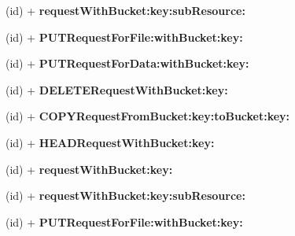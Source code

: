\begin{DoxyCompactItemize}
\item 
\hypertarget{interface_a_s_i_s3_object_request_aac357e6e8d9eab201a5d97c6e2ad1574}{
(id) + {\bfseries request\-With\-Bucket\-:key\-:sub\-Resource\-:}}
\label{interface_a_s_i_s3_object_request_aac357e6e8d9eab201a5d97c6e2ad1574}

\item 
\hypertarget{interface_a_s_i_s3_object_request_a07ff4bdb86902d59cb602be9bdc7ac14}{
(id) + {\bfseries \-P\-U\-T\-Request\-For\-File\-:with\-Bucket\-:key\-:}}
\label{interface_a_s_i_s3_object_request_a07ff4bdb86902d59cb602be9bdc7ac14}

\item 
\hypertarget{interface_a_s_i_s3_object_request_a06b5bf032c9b54a0fd0b17e0d1fecad5}{
(id) + {\bfseries \-P\-U\-T\-Request\-For\-Data\-:with\-Bucket\-:key\-:}}
\label{interface_a_s_i_s3_object_request_a06b5bf032c9b54a0fd0b17e0d1fecad5}

\item 
\hypertarget{interface_a_s_i_s3_object_request_a0602fac9aee5730f513b0a49e2be0dd9}{
(id) + {\bfseries \-D\-E\-L\-E\-T\-E\-Request\-With\-Bucket\-:key\-:}}
\label{interface_a_s_i_s3_object_request_a0602fac9aee5730f513b0a49e2be0dd9}

\item 
\hypertarget{interface_a_s_i_s3_object_request_a0048cc08b9cfef9c78abd81faa472d48}{
(id) + {\bfseries \-C\-O\-P\-Y\-Request\-From\-Bucket\-:key\-:to\-Bucket\-:key\-:}}
\label{interface_a_s_i_s3_object_request_a0048cc08b9cfef9c78abd81faa472d48}

\item 
\hypertarget{interface_a_s_i_s3_object_request_a88538201f1def9da2ff385880b78c8ef}{
(id) + {\bfseries \-H\-E\-A\-D\-Request\-With\-Bucket\-:key\-:}}
\label{interface_a_s_i_s3_object_request_a88538201f1def9da2ff385880b78c8ef}

\item 
\hypertarget{interface_a_s_i_s3_object_request_a8fc06d7585b85db69f81678fc1560ab0}{
(id) + {\bfseries request\-With\-Bucket\-:key\-:}}
\label{interface_a_s_i_s3_object_request_a8fc06d7585b85db69f81678fc1560ab0}

\item 
\hypertarget{interface_a_s_i_s3_object_request_aac357e6e8d9eab201a5d97c6e2ad1574}{
(id) + {\bfseries request\-With\-Bucket\-:key\-:sub\-Resource\-:}}
\label{interface_a_s_i_s3_object_request_aac357e6e8d9eab201a5d97c6e2ad1574}

\item 
\hypertarget{interface_a_s_i_s3_object_request_a07ff4bdb86902d59cb602be9bdc7ac14}{
(id) + {\bfseries \-P\-U\-T\-Request\-For\-File\-:with\-Bucket\-:key\-:}}
\label{interface_a_s_i_s3_object_request_a07ff4bdb86902d59cb602be9bdc7ac14}


\end{DoxyCompactItemize}
